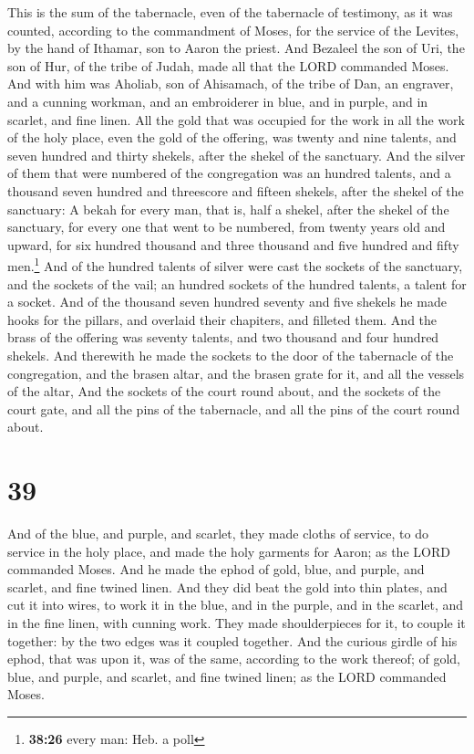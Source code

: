  This is the sum of the tabernacle, even of the
tabernacle of testimony, as it was counted, according to the commandment
of Moses, for the service of the Levites, by the hand of Ithamar, son to
Aaron the priest.  And Bezaleel the son of Uri, the son
of Hur, of the tribe of Judah, made all that the LORD commanded Moses.
 And with him was Aholiab, son of Ahisamach, of the tribe
of Dan, an engraver, and a cunning workman, and an embroiderer in blue,
and in purple, and in scarlet, and fine linen.  All the
gold that was occupied for the work in all the work of the holy place,
even the gold of the offering, was twenty and nine talents, and seven
hundred and thirty shekels, after the shekel of the sanctuary.
 And the silver of them that were numbered of the
congregation was an hundred talents, and a thousand seven hundred and
threescore and fifteen shekels, after the shekel of the sanctuary:
 A bekah for every man, that is, half a shekel, after the
shekel of the sanctuary, for every one that went to be numbered, from
twenty years old and upward, for six hundred thousand and three thousand
and five hundred and fifty men.\footnote{\textbf{38:26} every man: Heb.
  a poll}  And of the hundred talents of silver were cast
the sockets of the sanctuary, and the sockets of the vail; an hundred
sockets of the hundred talents, a talent for a socket. 
And of the thousand seven hundred seventy and five shekels he made hooks
for the pillars, and overlaid their chapiters, and filleted them.
 And the brass of the offering was seventy talents, and
two thousand and four hundred shekels.  And therewith he
made the sockets to the door of the tabernacle of the congregation, and
the brasen altar, and the brasen grate for it, and all the vessels of
the altar,  And the sockets of the court round about, and
the sockets of the court gate, and all the pins of the tabernacle, and
all the pins of the court round about.

\hypertarget{section-38}{%
\section{39}\label{section-38}}

 And of the blue, and purple, and scarlet, they made
cloths of service, to do service in the holy place, and made the holy
garments for Aaron; as the LORD commanded Moses.  And he
made the ephod of gold, blue, and purple, and scarlet, and fine twined
linen.  And they did beat the gold into thin plates, and
cut it into wires, to work it in the blue, and in the purple, and in the
scarlet, and in the fine linen, with cunning work.  They
made shoulderpieces for it, to couple it together: by the two edges was
it coupled together.  And the curious girdle of his ephod,
that was upon it, was of the same, according to the work thereof; of
gold, blue, and purple, and scarlet, and fine twined linen; as the LORD
commanded Moses.

